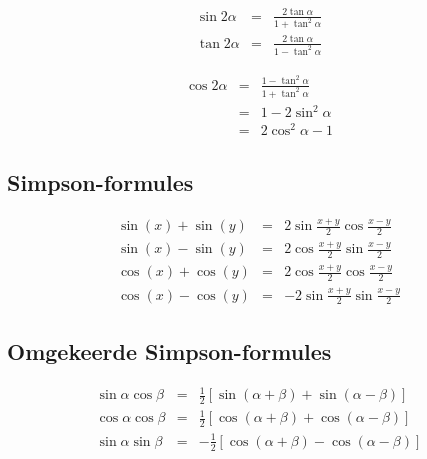 \documentclass[a4paper,12pt]{article}
\begin{document}
\begin{minipage}[b]{0.5\linewidth}
\begin{eqnarray*}
\sin2\alpha &=& \frac{2\tan\alpha}{1+\tan^2\alpha}\\
\tan2\alpha &=& \frac{2\tan \alpha}{1-\tan^2\alpha}
\end{eqnarray*}
\end{minipage}
\hspace{0.5cm}
\begin{minipage}[b]{0.5\linewidth}
\begin{eqnarray*}
\cos2\alpha &=& \frac{1-\tan^2\alpha}{1+\tan^2\alpha}\\
&=& 1-2\sin^2\alpha\\
&=& 2\cos^2\alpha-1
\end{eqnarray*}
\end{minipage}

\subsection{Simpson-formules}

\begin{eqnarray*}
\sin(x)+\sin(y)&=&2\sin\frac{x+y}{2}\cos\frac{x-y}{2}\\
\sin(x)-\sin(y)&=&2\cos\frac{x+y}{2}\sin\frac{x-y}{2}\\
\cos(x)+\cos(y)&=&2\cos\frac{x+y}{2}\cos\frac{x-y}{2}\\
\cos(x)-\cos(y)&=&-2\sin\frac{x+y}{2}\sin\frac{x-y}{2}
\end{eqnarray*}

\subsection{Omgekeerde Simpson-formules}

\begin{eqnarray*}
\sin\alpha\cos\beta&=&\frac{1}{2}\left[\sin(\alpha + \beta)+\sin(\alpha - \beta)\right]\\
\cos\alpha\cos\beta&=&\frac{1}{2}\left[\cos(\alpha + \beta)+\cos(\alpha - \beta)\right]\\
\sin\alpha\sin\beta&=&-\frac{1}{2}\left[\cos(\alpha + \beta)-\cos(\alpha - \beta)\right]
\end{eqnarray*}
\end{document}
